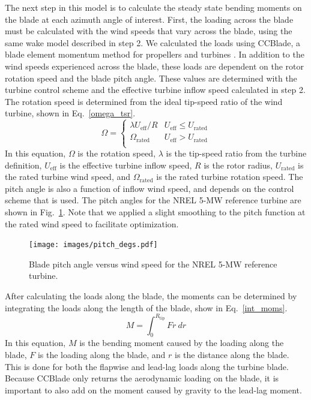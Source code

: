 \documentclass[11pt,letterpaper]{article}
\begin{document}
The next step in this model is to calculate the steady state bending moments on the blade at each azimuth angle of interest. First, the loading across the blade must be calculated with the wind speeds that vary across the blade, using the same wake model described in step 2. We calculated the loads using CCBlade, a blade element momentum method for propellers and turbines \cite{Ning2020}. In addition to the wind speeds experienced across the blade, these loads are dependent on the rotor rotation speed and the blade pitch angle. These values are determined with the turbine control scheme and the effective turbine inflow speed calculated in step 2. The rotation speed is determined from the ideal tip-speed ratio of the wind turbine, shown in Eq.~\ref{omega_tsr}. 
% 
\begin{equation}
    \Omega = \begin{cases} 
      \lambda U_\text{eff}/R &  U_\text{eff} \leq U_\text{rated} \\
      \Omega_\text{rated} &  U_\text{eff} > U_\text{rated}\\
   \end{cases}
   \label{omega_tsr}
\end{equation}
% 
In this equation, $\Omega$ is the rotation speed, $\lambda$ is the tip-speed ratio from the turbine definition, $U_\text{eff}$ is the effective turbine inflow speed, $R$ is the rotor radius, $U_\text{rated}$ is the rated turbine wind speed, and $\Omega_\text{rated}$ is the rated turbine rotation speed.
The pitch angle is also a function of inflow wind speed, and depends on the control scheme that is used. The pitch angles for the NREL 5-MW reference turbine are shown in Fig.~\ref{pitch_fig}. Note that we applied a slight smoothing to the pitch function at the rated wind speed to facilitate optimization.
% 
\begin{figure}
    \centering
    \texttt{[image: images/pitch\_degs.pdf]}
    \caption{Blade pitch angle versus wind speed for the NREL 5-MW reference turbine.}
    \label{pitch_fig}
\end{figure}

After calculating the loads along the blade, the moments can be determined by integrating the loads along the length of the blade, show in Eq.~\ref{int_moms}. 
%
\begin{equation}
    \label{int_moms}
    M = \int_0^{R_{\text{tip}}} Fr~dr
\end{equation}
%
In this equation, $M$ is the bending moment caused by the loading along the blade, $F$ is the loading along the blade, and $r$ is the distance along the blade.
This is done for both the flapwise and lead-lag loads along the turbine blade. Because CCBlade only returns the aerodynamic loading on the blade, it is important to also add on the moment caused by gravity to the lead-lag moment.
\end{document}
